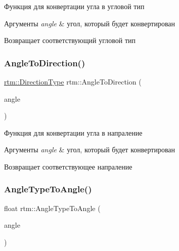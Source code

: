 Функция для конвертации угла в угловой тип 


\begin{DoxyParams}{Аргументы}
{\em angle} & угол, который будет конвертирован \\
\hline
\end{DoxyParams}
\begin{DoxyReturn}{Возвращает}
соответствующий угловой тип 
\end{DoxyReturn}
\mbox{\label{namespacertm_ac81b2243a62081233f7b549248b5a145}} 
\subsubsection{\texorpdfstring{Angle\+To\+Direction()}{AngleToDirection()}}
{\footnotesize\ttfamily \hyperlink{namespacertm_a57b216f3aeb45041f3461bab08bc3aeb}{rtm\+::\+Direction\+Type} rtm\+::\+Angle\+To\+Direction (\begin{DoxyParamCaption}\item[{float}]{angle }\end{DoxyParamCaption})}



Функция для конвертации угла в напраление 


\begin{DoxyParams}{Аргументы}
{\em angle} & угол, который будет конвертирован \\
\hline
\end{DoxyParams}
\begin{DoxyReturn}{Возвращает}
соответствующее напраление 
\end{DoxyReturn}
\mbox{\label{namespacertm_ad13b014bcdda27e0ff2fb23f265e29e4}} 
\subsubsection{\texorpdfstring{Angle\+Type\+To\+Angle()}{AngleTypeToAngle()}}
{\footnotesize\ttfamily float rtm\+::\+Angle\+Type\+To\+Angle (\begin{DoxyParamCaption}\item[{\hyperlink{namespacertm_a69dc82b16a0148c10962caa83d930f89}{Angle\+Type}}]{angle }\end{DoxyParamCaption})}



